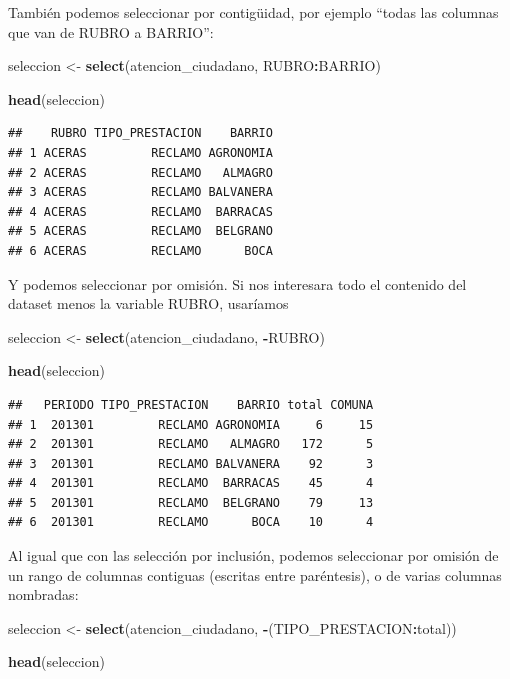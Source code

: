 \documentclass[]{book}
\newenvironment{Shaded}{\begin{snugshade}}{\end{snugshade}}
\newcommand{\KeywordTok}[1]{\textcolor[rgb]{0.13,0.29,0.53}{\textbf{#1}}}
\newcommand{\StringTok}[1]{\textcolor[rgb]{0.31,0.60,0.02}{#1}}
\newcommand{\OperatorTok}[1]{\textcolor[rgb]{0.81,0.36,0.00}{\textbf{#1}}}
\newcommand{\NormalTok}[1]{#1}
\begin{document}
También podemos seleccionar por contigüidad, por ejemplo ``todas las
columnas que van de RUBRO a BARRIO'':

\begin{Shaded}
\begin{Highlighting}[]
\NormalTok{seleccion <-}\StringTok{ }\KeywordTok{select}\NormalTok{(atencion_ciudadano, RUBRO}\OperatorTok{:}\NormalTok{BARRIO)}

\KeywordTok{head}\NormalTok{(seleccion)}
\end{Highlighting}
\end{Shaded}

\begin{verbatim}
##    RUBRO TIPO_PRESTACION    BARRIO
## 1 ACERAS         RECLAMO AGRONOMIA
## 2 ACERAS         RECLAMO   ALMAGRO
## 3 ACERAS         RECLAMO BALVANERA
## 4 ACERAS         RECLAMO  BARRACAS
## 5 ACERAS         RECLAMO  BELGRANO
## 6 ACERAS         RECLAMO      BOCA
\end{verbatim}

Y podemos seleccionar por omisión. Si nos interesara todo el contenido
del dataset menos la variable RUBRO, usaríamos

\begin{Shaded}
\begin{Highlighting}[]
\NormalTok{seleccion <-}\StringTok{ }\KeywordTok{select}\NormalTok{(atencion_ciudadano, }\OperatorTok{-}\NormalTok{RUBRO)}

\KeywordTok{head}\NormalTok{(seleccion)}
\end{Highlighting}
\end{Shaded}

\begin{verbatim}
##   PERIODO TIPO_PRESTACION    BARRIO total COMUNA
## 1  201301         RECLAMO AGRONOMIA     6     15
## 2  201301         RECLAMO   ALMAGRO   172      5
## 3  201301         RECLAMO BALVANERA    92      3
## 4  201301         RECLAMO  BARRACAS    45      4
## 5  201301         RECLAMO  BELGRANO    79     13
## 6  201301         RECLAMO      BOCA    10      4
\end{verbatim}

Al igual que con las selección por inclusión, podemos seleccionar por
omisión de un rango de columnas contiguas (escritas entre paréntesis), o
de varias columnas nombradas:

\begin{Shaded}
\begin{Highlighting}[]
\NormalTok{seleccion <-}\StringTok{ }\KeywordTok{select}\NormalTok{(atencion_ciudadano, }\OperatorTok{-}\NormalTok{(TIPO_PRESTACION}\OperatorTok{:}\NormalTok{total))}

\KeywordTok{head}\NormalTok{(seleccion)}
\end{Highlighting}
\end{Shaded}
\end{document}
